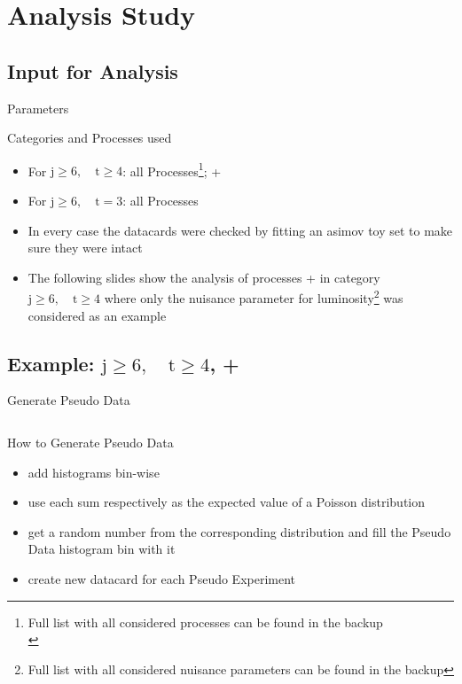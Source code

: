 \section{\ttbarH Analysis Study}
\subsection{Input for Analysis}
\begin{frame}{Parameters}
\begin{block}{Categories and Processes used}
\begin{itemize}
\item For $\text{j}\geq 6,\quad \text{t}\geq 4$: all Processes\footnote{Full list with all considered processes can be found in the backup\\}; \ttbarH \bbbar + \ttbar\bbbar\\
\item For $\text{j}\geq 6,\quad \text{t} = 3$: all Processes
\end{itemize}
\end{block}

\begin{itemize}
\item In every case the datacards were checked by fitting an asimov toy set to make sure they were intact
\item The following slides show the analysis of processes \ttbarH \bbbar + \ttbar\bbbar in category $\text{j}\geq 6,\quad \text{t}\geq 4$ where only the nuisance parameter for luminosity\footnote{Full list with all considered nuisance parameters can be found in the backup} was considered as an example
\end{itemize}

\end{frame}
\subsection{Example: $\text{j}\geq 6,\quad \text{t}\geq 4$, \ttbarH \bbbar + \ttbar\bbbar}

\begin{frame}{Generate Pseudo Data}
\begin{figure}
\centering
{}$\qquad$

\end{figure}
\begin{block}{How to Generate Pseudo Data}
\begin{itemize}
\item add histograms bin-wise
\item use each sum respectively as the expected value of a Poisson distribution
\item get a random number from the corresponding distribution and fill the Pseudo Data histogram bin with it
\item create new datacard for each Pseudo Experiment
\end{itemize}
\end{block}
\end{frame}

